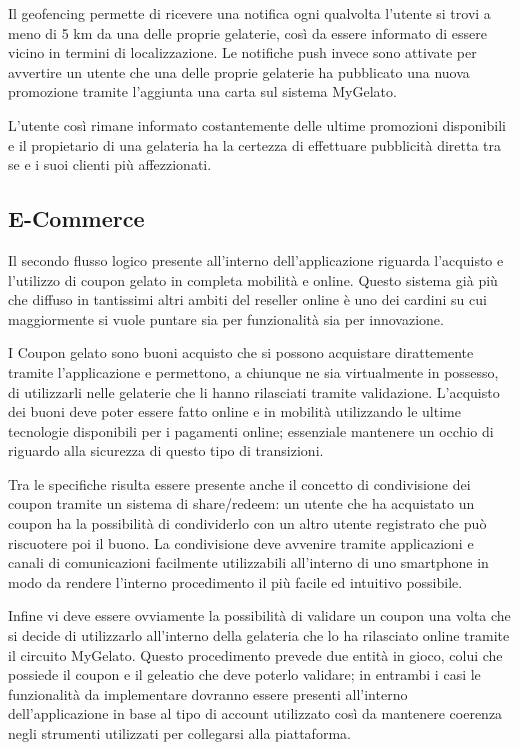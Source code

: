Il geofencing permette di ricevere una notifica ogni qualvolta l'utente si trovi a meno di 5 km da una delle proprie gelaterie, così da essere informato di essere vicino in termini di localizzazione.
Le notifiche push invece sono attivate per avvertire un utente che una delle proprie gelaterie ha pubblicato una nuova promozione tramite l'aggiunta una carta sul sistema MyGelato.

L'utente così rimane informato costantemente delle ultime promozioni disponibili e il propietario di una gelateria ha la certezza di effettuare pubblicità diretta tra se e i suoi clienti più affezzionati.

\subsection{E-Commerce}
Il secondo flusso logico presente all'interno dell'applicazione riguarda l'acquisto e l'utilizzo di coupon gelato in completa mobilità e online.
Questo sistema già più che diffuso in tantissimi altri ambiti del reseller online è uno dei cardini su cui maggiormente si vuole puntare sia per funzionalità sia per innovazione.

I Coupon gelato sono buoni acquisto che si possono acquistare dirattemente tramite l'applicazione e permettono, a chiunque ne sia virtualmente in possesso, di utilizzarli nelle gelaterie che li hanno rilasciati tramite validazione.
L'acquisto dei buoni deve poter essere fatto online e in mobilità utilizzando le ultime tecnologie disponibili per i pagamenti online; essenziale mantenere un occhio di riguardo alla sicurezza di questo tipo di transizioni.

Tra le specifiche risulta essere presente anche il concetto di condivisione dei coupon tramite un sistema di share/redeem: un utente che ha acquistato un coupon ha la possibilità di condividerlo con un altro utente registrato che può riscuotere poi il buono. La condivisione deve avvenire tramite applicazioni e canali di comunicazioni facilmente utilizzabili all'interno di uno smartphone in modo da rendere l'interno procedimento il più facile ed intuitivo possibile.

Infine vi deve essere ovviamente la possibilità di validare un coupon una volta che si decide di utilizzarlo all'interno della gelateria che lo ha rilasciato online tramite il circuito MyGelato. Questo procedimento prevede due entità in gioco, colui che possiede il coupon e il geleatio che deve poterlo validare; in entrambi i casi le funzionalità da implementare dovranno essere presenti all'interno dell'applicazione in base al tipo di account utilizzato così da mantenere coerenza negli strumenti utilizzati per collegarsi alla piattaforma.

